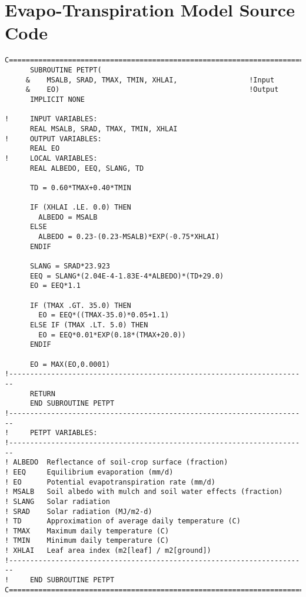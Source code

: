 \chapter{Evapo-Transpiration Model Source Code\label{apndxA}}

\begin{verbatim}
C=======================================================================
      SUBROUTINE PETPT(
     &    MSALB, SRAD, TMAX, TMIN, XHLAI,                 !Input
     &    EO)                                             !Output
      IMPLICIT NONE

!     INPUT VARIABLES:
      REAL MSALB, SRAD, TMAX, TMIN, XHLAI
!     OUTPUT VARIABLES:
      REAL EO
!     LOCAL VARIABLES:
      REAL ALBEDO, EEQ, SLANG, TD

      TD = 0.60*TMAX+0.40*TMIN

      IF (XHLAI .LE. 0.0) THEN
        ALBEDO = MSALB
      ELSE
        ALBEDO = 0.23-(0.23-MSALB)*EXP(-0.75*XHLAI)
      ENDIF

      SLANG = SRAD*23.923
      EEQ = SLANG*(2.04E-4-1.83E-4*ALBEDO)*(TD+29.0)
      EO = EEQ*1.1

      IF (TMAX .GT. 35.0) THEN
        EO = EEQ*((TMAX-35.0)*0.05+1.1)
      ELSE IF (TMAX .LT. 5.0) THEN
        EO = EEQ*0.01*EXP(0.18*(TMAX+20.0))
      ENDIF

      EO = MAX(EO,0.0001)
!-----------------------------------------------------------------------
      RETURN
      END SUBROUTINE PETPT
!-----------------------------------------------------------------------
!     PETPT VARIABLES:
!-----------------------------------------------------------------------
! ALBEDO  Reflectance of soil-crop surface (fraction)
! EEQ     Equilibrium evaporation (mm/d)
! EO      Potential evapotranspiration rate (mm/d)
! MSALB   Soil albedo with mulch and soil water effects (fraction)
! SLANG   Solar radiation
! SRAD    Solar radiation (MJ/m2-d)
! TD      Approximation of average daily temperature (C)
! TMAX    Maximum daily temperature (C)
! TMIN    Minimum daily temperature (C)
! XHLAI   Leaf area index (m2[leaf] / m2[ground])
!-----------------------------------------------------------------------
!     END SUBROUTINE PETPT
C=======================================================================
\end{verbatim}

